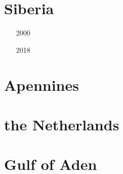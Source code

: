 \section{Siberia}

\begin{small}
\begin{itemize}
\item[2000] 
\item[2018] 
\end{itemize}
\end{small}


\section{Apennines}

\begin{small}
\begin{itemize}
\item[\nineteenninetyeight] 
\item[\twothousandseven] 
\item[\twothousandnine] 
\item[\twothousandfourteen] 
\item[\twothousandfifteen] 
\item[\twothousandtwenty] 
\end{itemize}
\end{small}

\section{the Netherlands}

\begin{small}
\begin{itemize}
\item[\twothousandtwo]  
\item[\twothousandtwenty]  
\end{itemize}
\end{small}

\section{Gulf of Aden}


